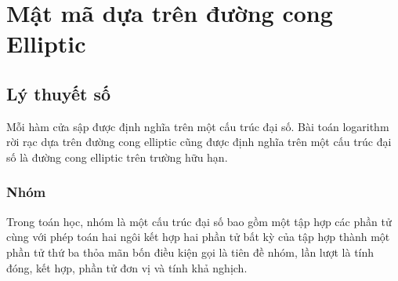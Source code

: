 \documentclass[a4paper,12pt]{report}
\begin{document}
\chapter{Mật mã dựa trên đường cong Elliptic}
\section{Lý thuyết số}
Mỗi hàm cửa sập được định nghĩa trên một cấu trúc đại số. Bài toán logarithm rời rạc dựa trên đường cong elliptic cũng được định nghĩa trên một cấu trúc đại số là đường cong elliptic trên
trường hữu hạn.
\subsection*{Nhóm}
Trong toán học, nhóm là một cấu trúc đại số bao gồm một tập hợp các phần tử cùng với phép toán hai ngôi kết hợp hai phần tử bất kỳ của tập hợp thành một phần tử thứ ba thỏa mãn bốn điều kiện gọi là tiên đề nhóm, lần lượt là tính đóng, kết hợp, phần tử đơn vị  và tính khả nghịch.
\end{document}
